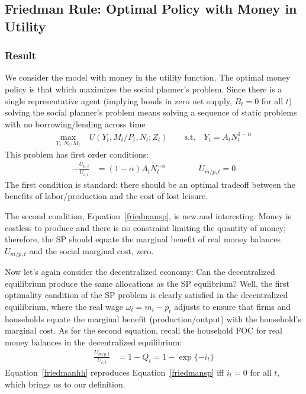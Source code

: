 \documentclass[12pt]{article}
\theoremstyle{plain}
\theoremstyle{definition}
\theoremstyle{remark}
\begin{document}
\clearpage
\subsection{Friedman Rule: Optimal Policy with Money in Utility}

\subsubsection{Result}

We consider the model with money in the utility function. The optimal
money policy is that which maximizes the social planner's problem.
Since there is a single representative agent (implying bonds in zero net
supply, $B_t=0$ for all $t$) solving the social planner's problem means
solving a sequence of static problems with no borrowing/lending across
time
\begin{align*}
  \max_{Y_t,N_t,M_t}
  &\;
  U(Y_t,M_t/P_t,N_t;Z_t)
  \qquad
  \text{s.t.}\quad
  Y_t = A_tN_t^{1-\alpha}
\end{align*}
This problem has first order conditions:
\begin{align}
  -\frac{U_{n,t}}{U_{c,t}}
  &= (1-\alpha)A_tN_t^{-\alpha}
  \qquad\qquad
  U_{m/p,t} = 0
  \label{friedmansp}
\end{align}
The first condition is standard: there should be an optimal tradeoff
between the benefits of labor/production and the cost of lost leisure.

The second condition, Equation~\ref{friedmansp}, is new and interesting.
Money is costless to produce and there is no constraint limiting
the quantity of money; therefore, the SP should equate the
marginal benefit of real money balances $U_{m/p,t}$ and the social
marginal cost, zero.

Now let's again consider the decentralized economy: Can the
decentralized equilibrium produce the same allocations as the SP
equlibrium? Well, the first optimality condition of the SP problem is
clearly satisfied in the decentralized equilibrium, where the real wage
$\omega_t=m_t-p_t$ adjusts to ensure that firms and households equate
the marginal benefit (production/output) with the household's marginal
cost. As for the second equation, recall the household FOC for real
money balances in the decentralized equilibrium:
\begin{align}
  \frac{U_{m/p,t}}{U_{c,t}} &= 1-Q_t
  = 1 - \exp\{-i_t\}
  \label{friedmanhh}
\end{align}
Equation~\ref{friedmanhh} reproduces Equation~\ref{friedmansp} iff
$i_t=0$ for all $t$, which brings us to our definition.
\end{document}
